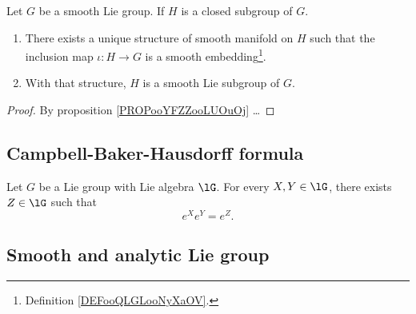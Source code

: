 \begin{theorem}     \label{THOooDEJHooVKJYBL}
    Let \( G\) be a smooth Lie group. If \( H\) is a closed subgroup of \( G\).

    \begin{enumerate}
        \item
        There exists a unique structure of smooth manifold on \( H\) such that the inclusion map \( \iota\colon H\to G\) is a smooth embedding\footnote{Definition \ref{DEFooQLGLooNyXaOV}.}.
\item
    With that structure, \( H\) is a smooth Lie subgroup of \( G\).
    \end{enumerate}
\end{theorem}

\begin{proof}
    By proposition \ref{PROPooYFZZooLUOuOj}  \ldots
\end{proof}

\subsection{Campbell-Baker-Hausdorff formula}

\begin{theorem}     \label{THOooYJPEooSpKHnC}
    Let \( G\) be a Lie group with Lie algebra \( \lG\). For every \( X,Y\in \lG\), there exists \( Z\in \lG\) such that
    \begin{equation}
        e^{X} e^{Y}= e^{Z}.
    \end{equation}
\end{theorem}

\subsection{Smooth and analytic Lie group}

